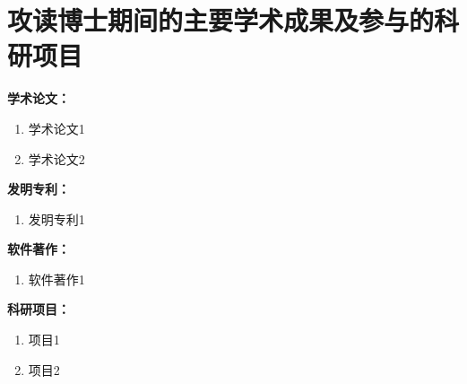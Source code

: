 

\chapter*{攻读博士期间的主要学术成果及参与的科研项目}


\noindent\textbf{学术论文：}
\begin{enumerate}
    \item 学术论文1
    \item 学术论文2
\end{enumerate}



\noindent\textbf{发明专利：}
\begin{enumerate}
    \item 发明专利1
\end{enumerate}


\noindent\textbf{软件著作：}
\begin{enumerate}
    \item 软件著作1
\end{enumerate}



\noindent\textbf{科研项目：}
\begin{enumerate}
    \item 项目1
    \item 项目2
\end{enumerate}



